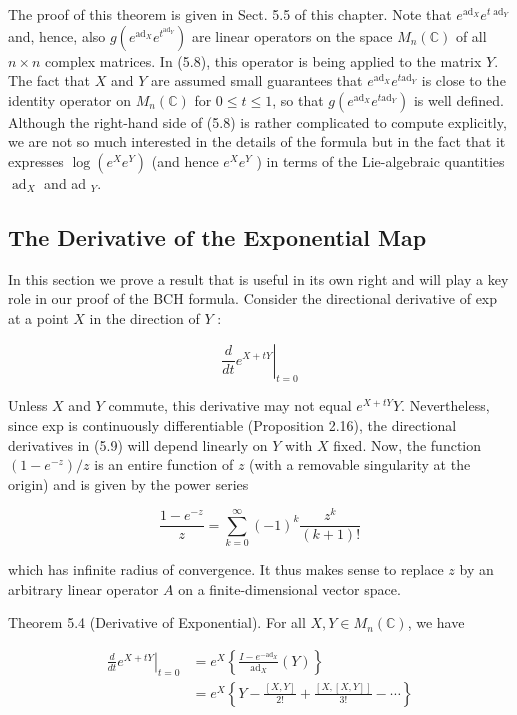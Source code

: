 \documentclass[10pt, letterpaper]{article}
\begin{document}
The proof of this theorem is given in Sect. 5.5 of this chapter. Note that $e^{\operatorname{ad}_{X}} e^{t \operatorname{ad}_{Y}}$ and, hence, also $g\left(e^{\mathrm{ad}_{X}} e^{t^{\mathrm{ad}_{Y}}}\right)$ are linear operators on the space $M_{n}(\mathbb{C})$ of all $n \times n$ complex matrices. In (5.8), this operator is being applied to the matrix $Y$. The fact that $X$ and $Y$ are assumed small guarantees that $e^{\mathrm{ad}_{X}} e^{t \mathrm{ad}_{Y}}$ is close to the identity operator on $M_{n}(\mathbb{C})$ for $0 \leq t \leq 1$, so that $g\left(e^{\mathrm{ad}_{X}} e^{t \mathrm{ad}_{Y}}\right)$ is well defined. Although the right-hand side of (5.8) is rather complicated to compute explicitly, we are not so much interested in the details of the formula but in the fact that it expresses $\log \left(e^{X} e^{Y}\right)$ (and hence $e^{X} e^{Y}$ ) in terms of the Lie-algebraic quantities $\operatorname{ad}_{X}$ and ad $_{Y}$.

\subsection*{The Derivative of the Exponential Map}
In this section we prove a result that is useful in its own right and will play a key role in our proof of the BCH formula. Consider the directional derivative of exp at a point $X$ in the direction of $Y$ :

$$
\left.\frac{d}{d t} e^{X+t Y}\right|_{t=0}
$$

Unless $X$ and $Y$ commute, this derivative may not equal $e^{X+t Y} Y$. Nevertheless, since exp is continuously differentiable (Proposition 2.16), the directional derivatives in (5.9) will depend linearly on $Y$ with $X$ fixed. Now, the function $\left(1-e^{-z}\right) / z$ is an entire function of $z$ (with a removable singularity at the origin) and is given by the power series

$$
\frac{1-e^{-z}}{z}=\sum_{k=0}^{\infty}(-1)^{k} \frac{z^{k}}{(k+1)!}
$$

which has infinite radius of convergence. It thus makes sense to replace $z$ by an arbitrary linear operator $A$ on a finite-dimensional vector space.

Theorem 5.4 (Derivative of Exponential). For all $X, Y \in M_{n}(\mathbb{C})$, we have

$$
\begin{aligned}
\left.\frac{d}{d t} e^{X+t Y}\right|_{t=0} & =e^{X}\left\{\frac{I-e^{-\mathrm{ad}_{X}}}{\operatorname{ad}_{X}}(Y)\right\} \\
& =e^{X}\left\{Y-\frac{[X, Y]}{2!}+\frac{[X,[X, Y]]}{3!}-\cdots\right\}
\end{aligned}
$$
\end{document}
